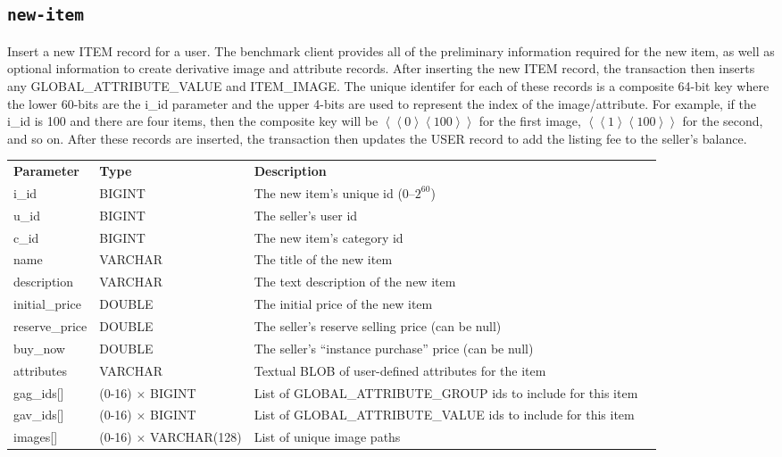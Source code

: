 \documentclass[a4paper,10pt]{article}
\begin{document}
\subsection{\texttt{new-item}}
Insert a new ITEM record for a user. The benchmark client provides all of the preliminary information required for the new item, as well as optional information to create derivative image and attribute records. After inserting the new ITEM record, the transaction then inserts any GLOBAL\_ATTRIBUTE\_VALUE and ITEM\_IMAGE. The unique identifer for each of these records is a composite 64-bit key where the lower 60-bits are the i\_id parameter and the upper 4-bits are used to represent the index of the image/attribute. For example, if the i\_id is 100 and there are four items, then the composite key will be $\left\langle\left\langle 0\right\rangle\left\langle 100\right\rangle\right\rangle$ for the first image, $\left\langle\left\langle 1\right\rangle\left\langle 100\right\rangle\right\rangle$ for the second, and so on. After these records are inserted, the transaction then updates the USER record to add the listing fee to the seller's balance.  \\

\noindent \begin{tabular*}{\textwidth}{@{\extracolsep{\fill}} llll}
\textbf{Parameter} & \textbf{Type} & \textbf{Description} \\
i\_id           & BIGINT                & The new item's unique id (0--$2^{60}$)\\
u\_id           & BIGINT                & The seller's user id \\
c\_id           & BIGINT                & The new item's category id \\
name            & VARCHAR               & The title of the new item \\
description     & VARCHAR               & The text description of the new item \\
initial\_price  & DOUBLE                & The initial price of the new item \\
reserve\_price  & DOUBLE                & The seller's reserve selling price (can be null) \\
buy\_now        & DOUBLE                & The seller's ``instance purchase'' price (can be null) \\
attributes      & VARCHAR               & Textual BLOB of user-defined attributes for the item \\
gag\_ids[]      & (0-16) $\times$ BIGINT & List of GLOBAL\_ATTRIBUTE\_GROUP ids to include for this item \\
gav\_ids[]      & (0-16) $\times$ BIGINT & List of GLOBAL\_ATTRIBUTE\_VALUE ids to include for this item \\
images[]        & (0-16) $\times$ VARCHAR(128) & List of unique image paths \\
\end{tabular*}
\end{document}
